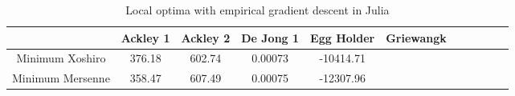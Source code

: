 \documentclass{article}
\begin{document}
            \begin{table}[h!]
                \begin{centering}
                    \begin{tabular}{|c|c|c|c|c|c|c|c|c|c|c|}
                        \hline
                                        & Ackley 1 & Ackley 2 & De Jong 1 & Egg Holder & Griewangk \\
                        \hline
                        \hline
                        Minimum Xoshiro & 376.18  & 602.74   & 0.00073   & -10414.71  &           \\
                        \hline
                        Minimum Mersenne& 358.47  & 607.49   & 0.00075   & -12307.96  &           \\
                        \hline
                    \end{tabular}
                    \caption{Local optima with empirical gradient descent in Julia}
            \end{centering}
            \end{table}
\end{document}

